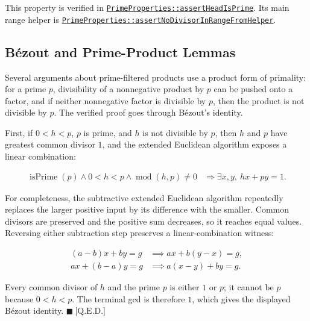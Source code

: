 This property is verified in
\href{https://github.com/thiagomata/prime-numbers/blob/euclid-theorem-article-v1.0.0/src/main/scala/v1/chapter5/prime/properties/PrimeProperties.scala}{\texttt{PrimeProperties::assertHeadIsPrime}}.
Its main range helper is
\href{https://github.com/thiagomata/prime-numbers/blob/euclid-theorem-article-v1.0.0/src/main/scala/v1/chapter5/prime/properties/PrimeProperties.scala}{\texttt{PrimeProperties::assertNoDivisorInRangeFromHelper}}.

\subsection{B\'ezout and Prime-Product Lemmas}
\label{sec:bezout-prime-product}

Several arguments about prime-filtered products use a product form of
primality: for a prime $p$, divisibility of a nonnegative product by $p$
can be pushed onto a factor, and if neither nonnegative factor is
divisible by $p$, then the product is not divisible by $p$. The verified
proof goes through B\'ezout's identity.

First, if $0 < h < p$, $p$ is prime, and $h$ is not divisible by $p$, then
$h$ and $p$ have greatest common divisor $1$, and the extended Euclidean
algorithm exposes a linear combination:

\begin{equation*}
\begin{aligned}
\operatorname{isPrime}(p)
\land 0 < h < p
\land \operatorname{mod}(h,p)\ne0
&\Rightarrow
\exists x,y,\ h x + p y = 1.
\end{aligned}
\end{equation*}

For completeness, the subtractive extended Euclidean algorithm repeatedly
replaces the larger positive input by its difference with the smaller.
Common divisors are preserved and the positive sum decreases, so it
reaches equal values. Reversing either subtraction step preserves a
linear-combination witness:

\begin{equation*}
\begin{aligned}
(a-b)x+by=g &\implies ax+b(y-x)=g, \\
ax+(b-a)y=g &\implies a(x-y)+by=g.
\end{aligned}
\end{equation*}

Every common divisor of $h$ and the prime $p$ is either $1$ or $p$; it
cannot be $p$ because $0<h<p$. The terminal gcd is therefore $1$, which
gives the displayed B\'ezout identity. $\blacksquare\ \text{[Q.E.D.]}$

